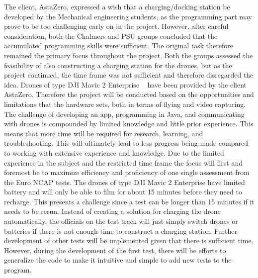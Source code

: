 \bigskip
The client, AstaZero, expressed a wish that a charging/docking station be developed by the Mechanical engineering students, as the programming part may prove to be too challenging early on in the project. However, after careful consideration, both the Chalmers and PSU groups concluded that the accumulated programming skills were sufficient. The original task therefore remained the primary focus throughout the project.
Both the groups assessed the feasibility of also constructing a charging station for the drones, but as the project continued, the time frame was not sufficient and therefore disregarded the idea. 
\bigskip
\newline
Drones of type DJI Mavic 2 Enterprise ~\cite{DJI2018MavicDJI} have been provided by the client AstaZero. Therefore the project will be conducted based on the opportunities and limitations that the hardware sets, both in terms of flying and video capturing. 
\bigskip
\newline
The challenge of developing an app, programming in Java, and communicating with drones is compounded by limited knowledge and little prior experience. This means that more time will be required for research, learning, and troubleshooting. This will ultimately lead to less progress being made compared to working with extensive experience and knowledge.
\bigskip
\newline
Due to the limited experience in the subject and the restricted time frame the focus will first and foremost be to maximize efficiency and proficiency of one single assessment from the Euro NCAP tests. 
\bigskip
\newline
The drones of type DJI Mavic 2 Enterprise  have limited battery and will only be able to film for about 15 minutes before they need to recharge. This presents a challenge since a test can be longer than 15 minutes if it needs to be rerun. Instead of creating a solution for charging the drone automatically, the officials on the test track will just simply switch drones or batteries if there is not enough time to construct a charging station.
\bigskip
\newline
Further development of other tests will be implemented given that there is sufficient time. However, during the development of the first test, there will be efforts to generalize the code to make it intuitive and simple to add new tests to the program.
